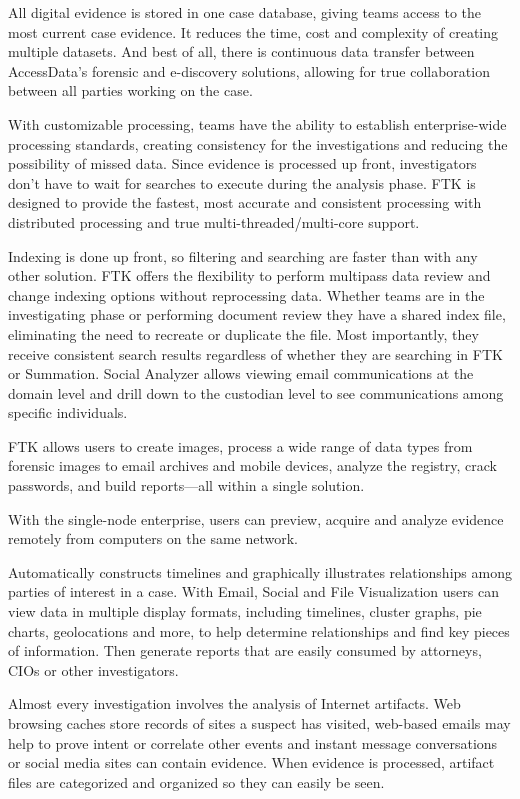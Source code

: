 All digital evidence is stored in one case database, giving teams access to the most current case evidence. It 
reduces the time, cost and complexity of creating multiple datasets. And best of all, there is continuous data transfer between AccessData's forensic 
and e-discovery solutions, allowing for true collaboration between all parties working on the case. 

With customizable processing, teams have the ability to establish enterprise-wide processing standards, creating 
consistency for the investigations and reducing the possibility of missed data. Since evidence is processed up 
front, investigators don't have to wait for searches to execute during the analysis phase. FTK is designed to provide the fastest, 
most accurate and consistent processing with distributed processing and true multi-threaded/multi-core support.

Indexing is done up front, so filtering and searching are faster than with any other solution. FTK offers 
the flexibility to perform multipass data review and change indexing options without reprocessing data. 
Whether teams are in the investigating phase or performing document review they have a shared index 
file, eliminating the need to recreate or duplicate the file. Most importantly, they receive consistent search 
results regardless of whether they are searching in FTK or Summation. Social Analyzer allows viewing email 
communications at the domain level and drill down to the custodian level to see communications among 
specific individuals. 

FTK allows users to create images, process a wide range of data types from forensic images to email archives and 
mobile devices, analyze the registry, crack passwords, and build reports—all within a single solution. 

With the single-node enterprise, users can preview, acquire and analyze evidence remotely from computers 
on the same network. 

Automatically constructs timelines and graphically illustrates relationships among parties of interest in a 
case. With Email, Social and File Visualization users can view data in multiple display formats, including timelines, 
cluster graphs, pie charts, geolocations and more, to help determine relationships and find key pieces 
of information. Then generate reports that are easily consumed by attorneys, CIOs or other investigators. 

Almost every investigation involves the analysis of Internet artifacts. Web browsing caches store records of sites a 
suspect has visited, web-based emails may help to prove intent or correlate other events and instant message 
conversations or social media sites can contain evidence. 
When evidence is processed, artifact files are categorized and organized so they can easily be seen. 

